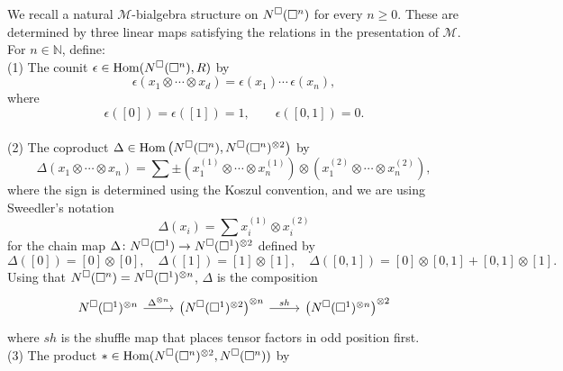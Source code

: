 We recall a natural $\mathcal M$-bialgebra structure on $N^{{\footnotesize \square}}(\square^n)$ for every $n \geq 0$.
These are determined by three linear maps satisfying the relations in the presentation of $\mathcal M$.
For $n \in \mathbb{N}$, define: \vspace*{5pt} \\
(1) The counit $\epsilon \in \mathrm{Hom}(N^{{\footnotesize \square}}(\square^n), R)$ by
\begin{equation*}
\epsilon \left( x_1 \otimes \cdots \otimes x_d \right) = \epsilon(x_1) \cdots \, \epsilon(x_n),
\end{equation*}
where
\begin{equation*}
\epsilon([0]) = \epsilon([1]) = 1, \qquad \epsilon([0, 1]) = 0.
\end{equation*} \vspace*{-6pt} \\
(2) The coproduct $\Delta \in \mathrm{Hom} \left( N^{{\footnotesize \square}}(\square^n), N^{{\footnotesize \square}}(\square^n)^{\otimes 2} \right)$ by
\begin{equation*}	
\Delta (x_1 \otimes \cdots \otimes x_n) = 	
\sum \pm \left( x_1^{(1)} \otimes \cdots \otimes x_n^{(1)} \right) \otimes 	
\left( x_1^{(2)} \otimes \cdots \otimes x_n^{(2)} \right),	
\end{equation*}	
where the sign is determined using the Koszul convention, and we are using Sweedler's notation
\begin{equation*}	
\Delta(x_i) = \sum x_i^{(1)} \otimes x_i^{(2)}
\end{equation*}
for the chain map $\Delta \colon N^{{\footnotesize \square}}(\square^1) \to N^{{\footnotesize \square}}(\square^1)^{\otimes 2}$ defined by
\begin{equation*}
\Delta([0]) = [0] \otimes [0], \quad \Delta([1]) = [1] \otimes [1], \quad \Delta([0, 1]) = [0] \otimes [0, 1] + [0, 1] \otimes [1].
\end{equation*}
Using that $N^{{\footnotesize \square}}(\square^n) = N^{{\footnotesize \square}}(\square^1)^{\otimes n}$, $\Delta$ is the composition
\begin{equation*}
\begin{tikzcd}
\cchains(\square^1)^{\otimes n} \arrow[r, "\Delta^{\otimes n}"] & \left( \cchains(\square^1)^{\otimes 2}  \right)^{\otimes n} \arrow[r, "sh"] & \left( \cchains(\square^1)^{\otimes n} \right)^{\otimes 2}
\end{tikzcd}
\end{equation*}
where $sh$ is the shuffle map that places tensor factors in odd position first. \vspace*{5pt} \\
(3) The product $\ast \in \mathrm{Hom}(N^{{\footnotesize \square}}(\square^n)^{\otimes 2}, N^{{\footnotesize \square}}(\square^n))$ by
